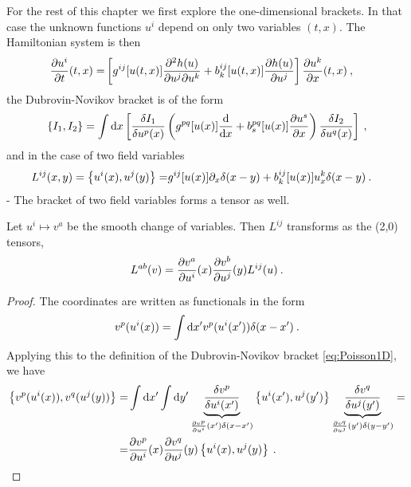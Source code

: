 For the rest of this chapter we first explore the one-dimensional brackets. In that case the unknown functions $u^i$ depend on only two variables $(t,x)$. The Hamiltonian system is then
\begin{align}
    \frac{\partial u^i}{\partial t} (t,x) =&
    \left[ g^{ij} [u(t,x)] \frac{\partial^2 h(u)}{\partial u^j \partial u^k} + b_k^{ij} [u(t,x)] \frac{\partial h(u)}{\partial u^j} \right] \frac{\partial u^k}{\partial x}(t,x) \:, 
\end{align}
the Dubrovin-Novikov bracket is of the form
\begin{align}
    \left \lbrace I_1,I_2 \right \rbrace = \int \mathrm{d} x
    \left[ \frac{\delta I_1}{\delta u^p(x)} \left( g^{pq}[u(x)] \frac{\mathrm{d}}{\mathrm{d}x} + b^{pq}_s[u(x)] \frac{\partial u^s}{\partial x} \right) \frac{\delta I_2}{\delta u^q(x)} \right] \:, \label{eq:Dubrovin-Novikov bracket 1D}
\end{align}
and in the case of two field variables
\begin{align}
    \label{eq:Poisson1D}
    L^{ij}(x,y) = \left \lbrace u^i(x), u^j(y) \right \rbrace =& g^{ij} [u(x)] \partial_x \delta(x-y) + b_k^{ij} [u(x)] u^k_x \delta(x-y) \:. 
\end{align}
-
The bracket of two field variables forms a tensor as well.

\begin{proposition}[Transformation of $L^{ij}$]
    Let $u^i \mapsto v^a$ be the smooth change of variables. Then $L^{ij}$ transforms as the (2,0) tensors,
    \begin{align}
        L^{ab}(v) = \frac{\partial v^a}{\partial u^i}(x) \frac{\partial v^b}{\partial u^j}(y) L^{ij}(u) \:. \label{eq:transformace-zavorka}
    \end{align}
\end{proposition}
\begin{proof}
    The coordinates are written as functionals in the form
    \begin{align}
        v^p(u^i(x)) = \int \mathrm{d} x' v^p(u^i(x')) \delta (x-x') \:.
    \end{align}
    Applying this to the definition of the Dubrovin-Novikov bracket \eqref{eq:Poisson1D}, we have
    \begin{align}
        \left \lbrace v^p(u^i(x)),v^q(u^j(y)) \right \rbrace 
        =& \int \mathrm{d} x' \int \mathrm{d} y' \underbrace{\frac{\delta v^p}{\delta u^i(x')} }_{\frac{\partial v^p}{\partial u^i}(x') \delta(x-x')} \left \lbrace u^i(x'),u^j(y') \right \rbrace \underbrace{\frac{\delta v^q}{\delta u^j(y')} }_{\frac{\partial v^q}{\partial u^j}(y') \delta(y-y')} \nonumber
        = \\ =& \frac{\partial v^p}{\partial u^i}(x) \frac{\partial v^q}{\partial u^j}(y) \left \lbrace u^i(x),u^j(y) \right \rbrace \:.
    \end{align}
\end{proof}

